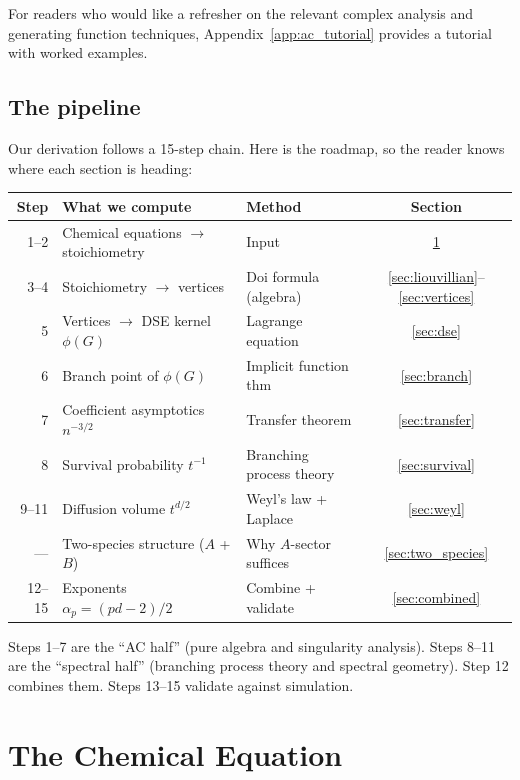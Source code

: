 \documentclass[11pt,a4paper]{article}
\theoremstyle{definition}
\begin{document}
For readers who would like a refresher on the relevant complex analysis
and generating function techniques, Appendix~\ref{app:ac_tutorial} provides
a tutorial with worked examples.

\subsection{The pipeline}

Our derivation follows a 15-step chain. Here is the roadmap, so the
reader knows where each section is heading:

\begin{center}
\small
\renewcommand{\arraystretch}{1.2}
\begin{tabular}{@{}rp{5cm}p{5cm}c@{}}
\toprule
\textbf{Step} & \textbf{What we compute} & \textbf{Method} & \textbf{Section} \\
\midrule
1--2 & Chemical equations $\to$ stoichiometry & Input & \ref{sec:chemical} \\
3--4 & Stoichiometry $\to$ vertices & Doi formula (algebra) & \ref{sec:liouvillian}--\ref{sec:vertices} \\
5 & Vertices $\to$ DSE kernel $\phi(G)$ & Lagrange equation & \ref{sec:dse} \\
6 & Branch point of $\phi(G)$ & Implicit function thm & \ref{sec:branch} \\
7 & Coefficient asymptotics $n^{-3/2}$ & Transfer theorem & \ref{sec:transfer} \\
8 & Survival probability $t^{-1}$ & Branching process theory & \ref{sec:survival} \\
9--11 & Diffusion volume $t^{d/2}$ & Weyl's law + Laplace & \ref{sec:weyl} \\
--- & Two-species structure ($A$ + $B$) & Why $A$-sector suffices & \ref{sec:two_species} \\
12--15 & Exponents $\alpha_p = (pd{-}2)/2$ & Combine + validate & \ref{sec:combined} \\
\bottomrule
\end{tabular}
\end{center}

Steps 1--7 are the ``AC half'' (pure algebra and singularity analysis).
Steps 8--11 are the ``spectral half'' (branching process theory and
spectral geometry). Step 12 combines them. Steps 13--15 validate against
simulation.

\section{The Chemical Equation}
\label{sec:chemical}
\end{document}

